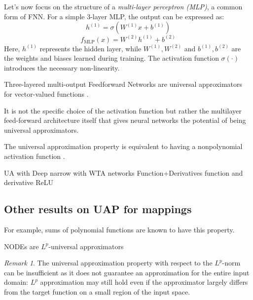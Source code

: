 \documentclass{article}
\theoremstyle{definition} \newtheorem{definition}{Definition}
\theoremstyle{remark} \newtheorem{remark}{Remark}
\newcounter{ct}
\begin{document}

Let’s now focus on the structure of a \textit{multi-layer perceptron (MLP)}, a common form of FNN. For a simple 3-layer MLP, the output can be expressed as:
\[
h^{(1)} = \sigma(W^{(1)} x + b^{(1)})
\]
\[
f_{\text{MLP}}(x) = W^{(2)} h^{(1)} + b^{(2)}
\]
Here, \(h^{(1)}\) represents the hidden layer, while \(W^{(1)}, W^{(2)}\) and \(b^{(1)}, b^{(2)}\) are the weights and biases learned during training. The activation function \(\sigma(\cdot)\) introduces the necessary non-linearity.

Three-layered multi-output Feedforward Networks are universal approximators for vector-valued functions \citep{irie1988capabilities}.





It is not the specific choice of the activation function but rather the multilayer feed-forward architecture itself that gives neural networks the potential of being universal approximators\citep{hornik1991approximation}.

The universal approximation property is equivalent to having a nonpolynomial activation function \citep{pinkus1999approximation}.

\citep{lowe1988multivariable}
\citep{mhaskar1997neural}
\citep{leshno1993multilayer}
UA with Deep narrow \citep{kidger2020universal}
with WTA networks \citep{maass2000wta}
Function+Derivatives \citep{hornik1990universal}
function and derivative \citep{li1996simultaneous}
ReLU\citep{huang2020relu}


\subsection{Other results on UAP for mappings}
For example, sums of polynomial functions are known to have this property\citep{llavona1986approximation}.
 
NODEs are $L^p$-universal approximators \citep{li2022deep,li2022deeparxiv}
\begin{remark}
The universal approximation property with respect to the $L^p$-norm can be insufficient as it does not guarantee an approximation for the entire input domain:
 $L^p$ approximation may still hold even if the approximator largely differs from the target function on a small region of the input space.
\end{remark}
\end{document}
